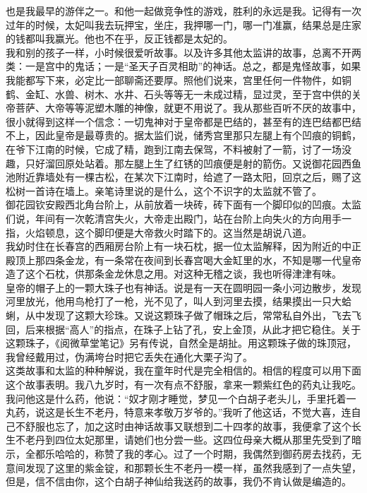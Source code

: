 也是我最早的游伴之一。和他一起做竞争性的游戏，胜利的永远是我。记得有一次过年的时候，太妃叫我去玩押宝，坐庄，我押哪一门，哪一门准赢，结果总是庄家的钱都叫我赢光。他也不在乎，反正钱都是太妃的。\\

我和别的孩子一样，小时候很爱听故事。以及许多其他太监讲的故事，总离不开两类：一是宫中的鬼话；一是“圣天子百灵相助”的神话。总之，都是鬼怪故事，如果我能都写下来，必定比一部聊斋还要厚。照他们说来，宫里任何一件物件，如铜鹤、金缸、水兽、树木、水井、石头等等无一未成过精，显过灵，至于宫中供的关帝菩萨、大帝等等泥塑木雕的神像，就更不用说了。我从那些百听不厌的故事中，很小就得到这样一个信念：一切鬼神对于皇帝都是巴结的，甚至有的连巴结都巴结不上，因此皇帝是最尊贵的。据太监们说，储秀宫里那只左腿上有个凹痕的铜鹤，在爷下江南的时候，它成了精，跑到江南去保驾，不料被射了一箭，讨了一场没趣，只好溜回原处站着。那左腿上生了红锈的凹痕便是射的箭伤。又说御花园西鱼池附近靠墙处有一棵古松，在某次下江南时，给遮了一路太阳，回京之后，赐了这松树一首诗在墙上。亲笔诗里说的是什么，这个不识字的太监就不管了。\\

御花园钦安殿西北角台阶上，从前放着一块砖，砖下面有一个脚印似的凹痕。太监们说，年间有一次乾清宫失火，大帝走出殿门，站在台阶上向失火的方向用手一指，火焰顿息，这个脚印便是大帝救火时踏下的。这当然是胡说八道。\\

我幼时住在长春宫的西厢房台阶上有一块石枕，据一位太监解释，因为附近的中正殿顶上那四条金龙，有一条常在夜间到长春宫喝大金缸里的水，不知是哪一代皇帝造了这个石枕，供那条金龙休息之用。对这种无稽之谈，我也听得津津有味。\\

皇帝的帽子上的一颗大珠子也有神话。说是有一天在圆明园一条小河边散步，发现河里放光，他用鸟枪打了一枪，光不见了，叫人到河里去摸，结果摸出一只大蛤蜊，从中发现了这颗大珍珠。又说这颗珠子做了帽珠之后，常常私自外出，飞去飞回，后来根据“高人”的指点，在珠子上钻了孔，安上金顶，从此才把它稳住。关于这颗珠子，《阅微草堂笔记》另有传说，自然全是胡扯。用这颗珠子做的珠顶冠，我曾经戴用过，伪满垮台时把它丢失在通化大栗子沟了。\\

这类故事和太监的种种解说，我在童年时代是完全相信的。相信的程度可以用下面这个故事表明。我八九岁时，有一次有点不舒服，拿来一颗紫红色的药丸让我吃。我问他这是什么药，他说：“奴才刚才睡觉，梦见一个白胡子老头儿，手里托着一丸药，说这是长生不老丹，特意来孝敬万岁爷的。”我听了他这话，不觉大喜，连自己不舒服也忘了，加之这时由神话故事又联想到二十四孝的故事，我便拿了这个长生不老丹到四位太妃那里，请她们也分尝一些。这四位母亲大概从那里先受到了暗示，全都乐哈哈的，称赞了我的孝心。过了一个时期，我偶然到御药房去找药，无意间发现了这里的紫金锭，和那颗长生不老丹一模一样，虽然我感到了一点失望，但是，信不信由你，这个白胡子神仙给我送药的故事，我仍不肯认做是编造的。\\

